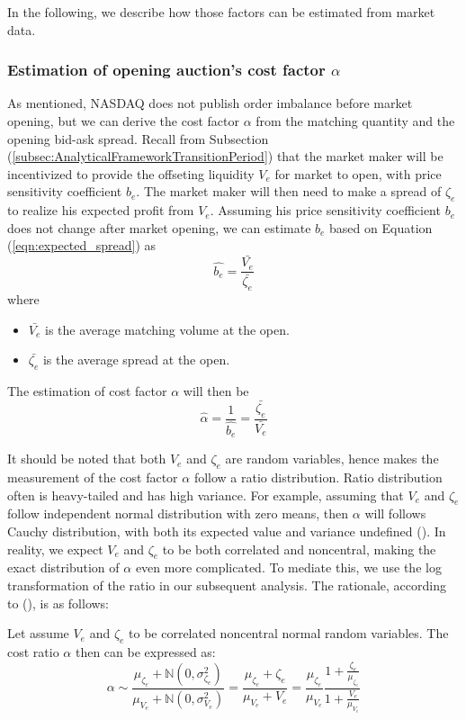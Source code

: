 In the following, we describe how those factors can be estimated from market data.

\subsubsection{Estimation of opening auction's cost factor $\alpha$}

As mentioned, NASDAQ does not publish order imbalance before market opening, but we can derive the cost factor $\alpha$ from the matching quantity and the opening bid-ask spread. Recall from Subsection (\ref{subsec:AnalyticalFrameworkTransitionPeriod}) that the market maker will be incentivized to provide the offseting liquidity $V_e$ for market to open, with price sensitivity coefficient $b_e$. The market maker will then need to make a spread of $\zeta_e$ to realize his expected profit from $V_e$. Assuming his price sensitivity coefficient $b_e$ does not change after market opening, we can estimate $b_e$ based on Equation (\ref{eqn:expected_spread}) as
\[
  \hat{b_e} = \frac{\bar{V_e}}{\bar{\zeta_e}}
\]
where
\begin{itemize}
  \item $\bar{V_e}$ is the average matching volume at the open.
  \item $\bar{\zeta_e}$ is the average spread at the open.
\end{itemize}

The estimation of cost factor $\alpha$ will then be
\[
  \hat{\alpha} = \frac{1}{\hat{b_e}}  = \frac{\bar{\zeta_e}}{\bar{V_e}}
\]

It should be noted that both $V_e$ and $\zeta_e$ are random variables, hence makes the measurement of the cost factor $\alpha$ follow a ratio distribution. Ratio distribution often is heavy-tailed and has high variance. For example, assuming that $V_e$ and $\zeta_e$ follow independent normal distribution with zero means, then $\alpha$ will follows Cauchy distribution, with both its expected value and variance undefined (\cite{Geary1930}). In reality, we expect $V_e$ and $\zeta_e$ to be both correlated and noncentral, making the exact distribution of $\alpha$ even more complicated. To mediate this, we use the log transformation of the ratio in our subsequent analysis. The rationale, according to (\cite{Katz1978}), is as follows:

Let assume $V_e$ and $\zeta_e$ to be correlated noncentral normal random variables. The cost ratio $\alpha$ then can be expressed as:
\[ \alpha \sim \frac{\mu_{\zeta_e} + \mathbb{N}(0, \sigma_{\zeta_e}^2 )}{\mu_{V_e} + \mathbb{N}(0, \sigma_{V_e}^2 )}
  = \frac{\mu_{\zeta_e} + \zeta_e}{\mu_{V_e} + V_e}
  = \frac{\mu_{\zeta_e}}{\mu_{V_e}}\frac{1+ \frac{\zeta_e}{\mu_{\zeta_e}}}{1+ \frac{V_e}{\mu_{V_e}}}
\]

